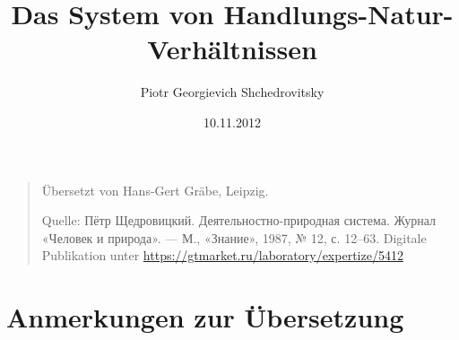 \documentclass[11pt,a4paper]{article}
\title{Das System von Handlungs-Natur-Verhältnissen}
\author{Piotr Georgievich Shchedrovitsky}
\date{10.11.2012}
\begin{document}
\maketitle
\begin{quote}
  Übersetzt von Hans-Gert Gräbe, Leipzig.
  
  Quelle: \foreignlanguage{russian}{Пётр Щедровицкий. Деятельностно-природная
    система. Журнал «Человек и природа». — М., «Знание», 1987, № 12,
    с. 12–63}.  Digitale Publikation unter
  \url{https://gtmarket.ru/laboratory/expertize/5412}
\end{quote}

\tableofcontents
\clearpage

\section*{Anmerkungen zur Übersetzung}
\end{document}
